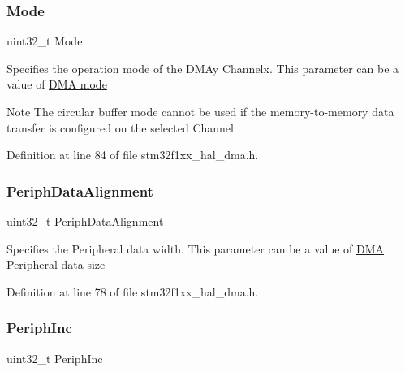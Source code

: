 \mbox{\label{struct_d_m_a___init_type_def_a0ffc93ec511ed9cf1663f6939bd3e839}} 
\subsubsection{\texorpdfstring{Mode}{Mode}}
{\footnotesize\ttfamily uint32\+\_\+t Mode}

Specifies the operation mode of the D\+M\+Ay Channelx. This parameter can be a value of \hyperlink{group___d_m_a__mode}{D\+MA mode} \begin{DoxyNote}{Note}
The circular buffer mode cannot be used if the memory-\/to-\/memory data transfer is configured on the selected Channel 
\end{DoxyNote}


Definition at line 84 of file stm32f1xx\+\_\+hal\+\_\+dma.\+h.

\mbox{\label{struct_d_m_a___init_type_def_aca5b89241171c093fd0fc6dacf72683c}} 
\subsubsection{\texorpdfstring{Periph\+Data\+Alignment}{PeriphDataAlignment}}
{\footnotesize\ttfamily uint32\+\_\+t Periph\+Data\+Alignment}

Specifies the Peripheral data width. This parameter can be a value of \hyperlink{group___d_m_a___peripheral__data__size}{D\+MA Peripheral data size} 

Definition at line 78 of file stm32f1xx\+\_\+hal\+\_\+dma.\+h.

\mbox{\label{struct_d_m_a___init_type_def_a4925ca3ceb52340daddc92817dc304d9}} 
\subsubsection{\texorpdfstring{Periph\+Inc}{PeriphInc}}
{\footnotesize\ttfamily uint32\+\_\+t Periph\+Inc}

